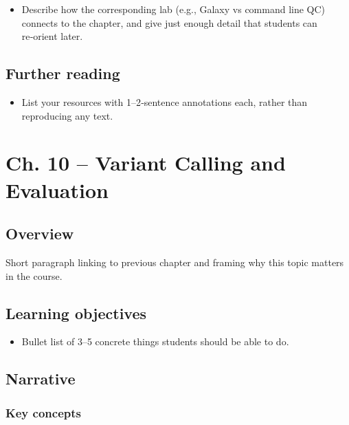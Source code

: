\documentclass[
  letterpaper,
  DIV=11,
  numbers=noendperiod]{scrreprt}
\providecommand{\tightlist}{%
  \setlength{\itemsep}{0pt}\setlength{\parskip}{0pt}}
\begin{document}
\begin{itemize}
\tightlist
\item
  Describe how the corresponding lab (e.g., Galaxy vs command line QC)
  connects to the chapter, and give just enough detail that students can
  re‑orient later.
\end{itemize}

\section{Further reading}\label{further-reading-5}

\begin{itemize}
\tightlist
\item
  List your resources with 1--2‑sentence annotations each, rather than
  reproducing any text.
\end{itemize}


\chapter{Ch. 10 -- Variant Calling and
Evaluation}\label{ch.-10-variant-calling-and-evaluation}

\section{Overview}\label{overview-6}

Short paragraph linking to previous chapter and framing why this topic
matters in the course.

\section{Learning objectives}\label{learning-objectives-6}

\begin{itemize}
\tightlist
\item
  Bullet list of 3--5 concrete things students should be able to do.
\end{itemize}

\section{Narrative}\label{narrative-6}

\subsection{Key concepts}\label{key-concepts-6}
\end{document}
